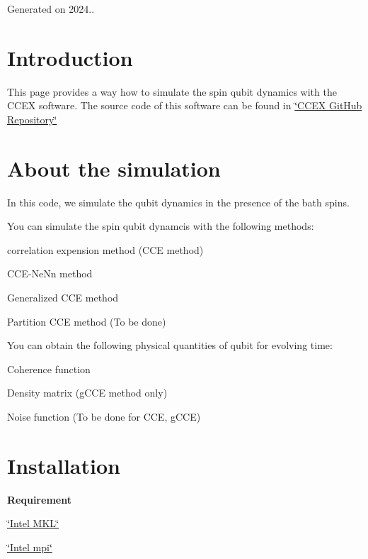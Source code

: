 Generated on 2024..\hypertarget{index_Introduction}{}\section{Introduction}\label{index_Introduction}
This page provides a way how to simulate the spin qubit dynamics with the C\-C\-E\-X software. The source code of this software can be found in \hyperlink{}{\char`\"{}\-C\-C\-E\-X Git\-Hub Repository\char`\"{} }\hypertarget{index_AboutTheSimulation}{}\section{About the simulation}\label{index_AboutTheSimulation}
In this code, we simulate the qubit dynamics in the presence of the bath spins.

You can simulate the spin qubit dynamcis with the following methods\-:
\begin{DoxyItemize}
\item correlation expension method (C\-C\-E method)
\item C\-C\-E-\/\-Ne\-Nn method
\item Generalized C\-C\-E method
\item Partition C\-C\-E method (To be done)
\end{DoxyItemize}

You can obtain the following physical quantities of qubit for evolving time\-:
\begin{DoxyItemize}
\item Coherence function
\item Density matrix (g\-C\-C\-E method only)
\item Noise function (To be done for C\-C\-E, g\-C\-C\-E)
\end{DoxyItemize}\hypertarget{index_Installation}{}\section{Installation}\label{index_Installation}



{\bfseries Requirement} {\bfseries } 
\begin{DoxyItemize}
\item \hyperlink{}{\char`\"{}\-Intel M\-K\-L\char`\"{} }
\item \hyperlink{}{\char`\"{}\-Intel mpi\char`\"{} }
\end{DoxyItemize}


